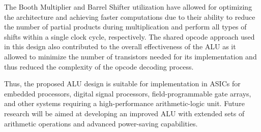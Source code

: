 \documentclass[conference]{IEEEtran}
\begin{document}
The Booth Multiplier and Barrel Shifter utilization have allowed for optimizing the architecture and achieving faster computations due to their ability to reduce the number of partial products during multiplication and perform all types of shifts within a single clock cycle, respectively. The shared opcode approach used in this design also contributed to the overall effectiveness of the ALU as it allowed to minimize the number of transistors needed for its implementation and thus reduced the complexity of the opcode decoding process.

Thus, the proposed ALU design is suitable for implementation in ASICs for embedded processors, digital signal processors, field-programmable gate arrays, and other systems requiring a high-performance arithmetic-logic unit. Future research will be aimed at developing an improved ALU with extended sets of arithmetic operations and advanced power-saving capabilities.
\end{document}
